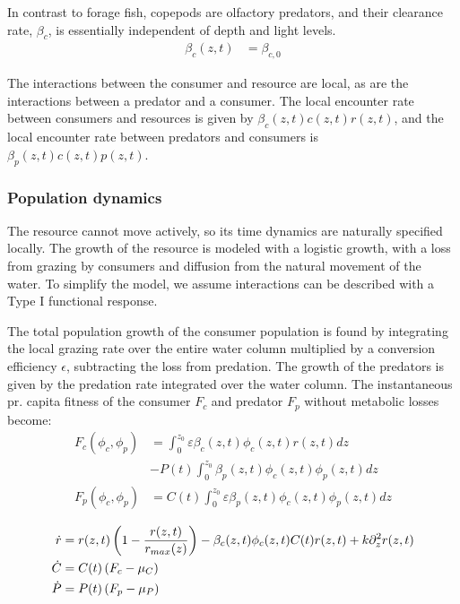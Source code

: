 In contrast to forage fish, copepods are olfactory predators, and their clearance rate, $\beta_c$, is essentially independent of depth and light levels.
\begin{align*}
	\beta_c(z,t) &=  \beta_{c,0}
\end{align*}

The interactions between the consumer and resource are local, as are the interactions between a predator and a consumer. The local encounter rate between consumers and resources is given by $\beta_c(z,t)c(z,t)r(z,t)$, and the local encounter rate between predators and consumers is $\beta_p(z,t)c(z,t)p(z,t)$.

\subsubsection*{Population dynamics}

The resource cannot move actively, so its time dynamics are naturally specified locally. The growth of the resource is modeled with a logistic growth, with a loss from grazing by consumers and diffusion from the natural movement of the water. To simplify the model, we assume interactions can be described with a Type I functional response. %


The total population growth of the consumer population is found by integrating the local grazing rate over the entire water column multiplied by a conversion efficiency $\epsilon$, subtracting the loss from predation. The growth of the predators is given by the predation rate integrated over the water column. The instantaneous pr. capita fitness of the consumer $F_c$ and predator $F_p$ without metabolic losses become:
\begin{align}
	F_c(\phi_c, \phi_p) &= \int_0^{z_0} \varepsilon \beta_c(z,t)\phi_c(z,t)r(z,t) dz\\ &- P(t)\int_0^{z_0} \beta_p(z,t) \phi_c(z,t) \phi_p(z,t)dz \\
	F_p(\phi_c, \phi_p) &=  C(t) \int_0^{z_0} \varepsilon \beta_p(z,t)\phi_c(z,t)\phi_p(z,t) dz
  \label{eq:fitness}
\end{align}

\begin{align}
	\dot{r} &= r(z,t)\pa{1-\frac{r(z,t)}{r_{max}(z)}} - \beta_c(z,t)\phi_c(z,t)C(t) r(z,t)  + k \partial_z^2 r(z,t)\\
	\dot{C} &= C(t)\left ( F_c - \mu_C \right ) \\
	\dot{P} &= P(t) \left ( F_p - \mu_P  \right )
  \label{eq:population_growth_prob_dens}
\end{align}

